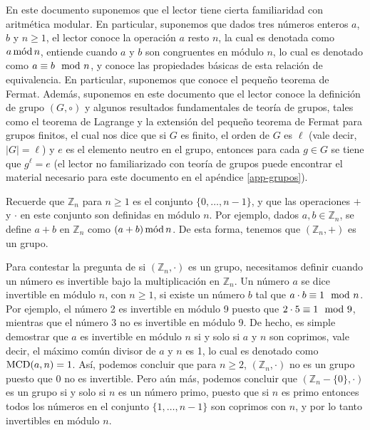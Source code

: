 En este documento suponemos que el lector tiene cierta familiaridad
con aritmética modular. En particular, suponemos que dados tres
números enteros $a$, $b$ y $n \geq 1$, el lector conoce la operación
$a$ resto $n$, la cual es denotada como $a \mods n$, entiende cuando
$a$ y $b$ son congruentes en módulo $n$, lo cual es denotado como $a
\equiv b \modl n$, y conoce las propiedades básicas de esta relación
de equivalencia. En particular, suponemos que conoce el pequeño
teorema de Fermat. Además, suponemos en este documento que el lector
conoce la definición de grupo $(G, \circ)$ y algunos resultados
fundamentales de teoría de grupos, tales como el teorema de Lagrange y
la extensión del pequeño teorema de Fermat para grupos finitos, el
cual nos dice que si $G$ es finito, el orden de $G$ es $\ell$ (vale
decir, $|G| = \ell$) y $e$ es el elemento neutro en el grupo, entonces
para cada $g \in G$ se tiene que $g^\ell = e$ (el lector no
familiarizado con teoría de grupos puede encontrar el material
necesario para este documento en el apéndice \ref{app-grupos}).

Recuerde que $\mathbb{Z}_n$ para $n \geq 1$ es el conjunto $\{0,
\ldots, n-1\}$, y que las operaciones $+$ y $\cdot$ en este conjunto
son definidas en módulo $n$. Por ejemplo, dados $a,b \in
\mathbb{Z}_n$, se define $a + b$ en $\mathbb{Z}_n$ como $(a + b) \mods
n$. De esta forma, tenemos que $(\mathbb{Z}_n, +)$ es un grupo.

Para contestar la pregunta de si $(\mathbb{Z}_n, \cdot)$ es un grupo,
necesitamos definir cuando un número es invertible bajo la
multiplicación en $\mathbb{Z}_n$.  Un número $a$ se dice invertible en
módulo $n$, con $n \geq 1$, si existe un número $b$ tal que $a \cdot b
\equiv 1 \modl n$. Por ejemplo, el número 2 es invertible en módulo 9
puesto que $2 \cdot 5 \equiv 1 \modl 9$, mientras que el número 3 no
es invertible en módulo 9. De hecho, es simple demostrar que $a$ es
invertible en módulo $n$ si y solo si $a$ y $n$ son coprimos, vale
decir, el máximo común divisor de $a$ y $n$ es 1, lo cual es denotado
como $\MCD(a,n) = 1$.  Así, podemos concluir que para $n \geq 2$,
$(\mathbb{Z}_n, \cdot)$ no es un grupo puesto que $0$ no es
invertible. Pero aún más, podemos concluir que $(\mathbb{Z}_n - \{0\},
\cdot)$ es un grupo si y solo si $n$ es un número primo, puesto que si
$n$ es primo entonces todos los números en el conjunto $\{1, \ldots,
n-1\}$ son coprimos con $n$, y por lo tanto invertibles en módulo $n$.

